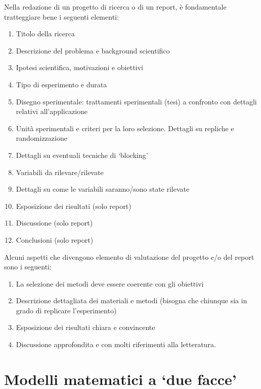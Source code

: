 \documentclass[a4paper,12pt,oneside]{book}
\providecommand{\tightlist}{%
  \setlength{\itemsep}{0pt}\setlength{\parskip}{0pt}}
\theoremstyle{definition}
\theoremstyle{definition}
\theoremstyle{definition}
\theoremstyle{remark}
\begin{document}
Nella redazione di un progetto di ricerca o di un report, è fondamentale
tratteggiare bene i seguenti elementi:

\begin{enumerate}
\def\labelenumi{\arabic{enumi}.}
\tightlist
\item
  Titolo della ricerca
\item
  Descrizione del problema e background scientifico
\item
  Ipotesi scientifica, motivazioni e obiettivi
\item
  Tipo di esperimento e durata
\item
  Disegno sperimentale: trattamenti sperimentali (tesi) a confronto con
  dettagli relativi all'applicazione
\item
  Unità sperimentali e criteri per la loro selezione. Dettagli su
  repliche e randomizzazione
\item
  Dettagli su eventuali tecniche di `blocking'
\item
  Variabili da rilevare/rilevate
\item
  Dettagli su come le variabili saranno/sono state rilevate
\item
  Esposizione dei risultati (solo report)
\item
  Discussione (solo report)
\item
  Conclusioni (solo report)
\end{enumerate}

Alcuni aspetti che divengono elemento di valutazione del progetto e/o
del report sono i seguenti:

\begin{enumerate}
\def\labelenumi{\arabic{enumi}.}
\tightlist
\item
  La selezione dei metodi deve essere coerente con gli obiettivi
\item
  Descrizione dettagliata dei materiali e metodi (bisogna che chiunque
  sia in grado di replicare l'esperimento)
\item
  Esposizione dei risultati chiara e convincente
\item
  Discussione approfondita e con molti riferimenti alla letteratura.
\end{enumerate}

\chapter{\texorpdfstring{Modelli matematici a `due
facce'}{Modelli matematici a due facce}}\label{modelli-matematici-a-due-facce}
\end{document}
